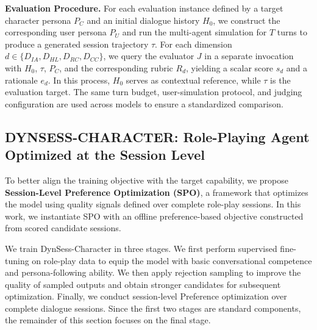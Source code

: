 \noindent \textbf{Evaluation Procedure.}
For each evaluation instance defined by a target character persona \(P_C\) and an initial dialogue history \(H_0\), we construct the corresponding user persona \(P_U\) and run the multi-agent simulation for \(T\) turns to produce a generated session trajectory \(\tau\). For each dimension \(d \in \{D_{IA}, D_{HL}, D_{RC}, D_{CC}\}\), we query the evaluator \(J\) in a separate invocation with \(H_0\), \(\tau\), \(P_C\), and the corresponding rubric \(R_d\), yielding a scalar score \(s_d\) and a rationale \(e_d\). In this process, \(H_0\) serves as contextual reference, while \(\tau\) is the evaluation target. The same turn budget, user-simulation protocol, and judging configuration are used across models to ensure a standardized comparison.








\subsection{\textsc{DYNSESS-CHARACTER}: Role-Playing Agent Optimized at the Session Level}

To better align the training objective with the target capability, we propose \textbf{Session-Level Preference Optimization (SPO)}, a framework that optimizes the model using quality signals defined over complete role-play sessions. In this work, we instantiate SPO with an offline preference-based objective constructed from scored candidate sessions.




We train DynSess-Character in three stages. We first perform supervised fine-tuning on role-play data to equip the model with basic conversational competence and persona-following ability. We then apply rejection sampling to improve the quality of sampled outputs and obtain stronger candidates for subsequent optimization. Finally, we conduct session-level Preference optimization over complete dialogue sessions. Since the first two stages are standard components, the remainder of this section focuses on the final stage.



